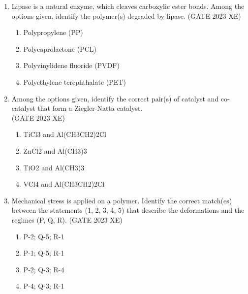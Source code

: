 \documentclass[journal,12pt,onecolumn]{IEEEtran}
\begin{document}
\begin{enumerate}
\begin{multicols}{2}
\begin{enumerate}
\item Dicumyl peroxide
\item Zinc stearate
\item Carbon black
\item Dinitrobenzene
\end{enumerate}
\end{multicols}

\item Lipase is a natural enzyme, which cleaves carboxylic ester bonds. Among the options given, identify the polymer(s) degraded by lipase.
\hfill{(GATE 2023 XE)}

\begin{multicols}{2}
\begin{enumerate}
\item Polypropylene (PP)
\item Polycaprolactone (PCL)
\item Polyvinylidene fluoride (PVDF)
\item Polyethylene terephthalate (PET)
\end{enumerate}
\end{multicols}

\newpage

\item Among the options given, identify the correct pair(s) of catalyst and co-catalyst that form a Ziegler-Natta catalyst.\\
\hfill{(GATE 2023 XE)}

\begin{multicols}{2}
\begin{enumerate}
\item TiCl3 and Al(CH3CH2)2Cl
\item ZnCl2 and Al(CH3)3
\item TiO2 and Al(CH3)3
\item VCl4 and Al(CH3CH2)2Cl
\end{enumerate}
\end{multicols}

\item Mechanical stress is applied on a polymer. Identify the correct match(es) between the statements (1, 2, 3, 4, 5) that describe the deformations and
the regimes (P, Q, R).
\hfill{(GATE 2023 XE)}



\begin{multicols}{2}
\begin{enumerate}
\item P-2; Q-5; R-1
\item P-1; Q-5; R-1
\item P-2; Q-3; R-4
\item P-4; Q-3; R-1
\end{enumerate}
\end{multicols}


\end{enumerate}
\end{document}
